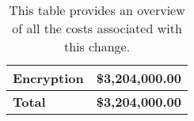\tiny \begin{longtable} {|l|r|} \caption{This table provides an overview of all the costs associated with this change.  \label{tab:totalcost}}\\ 
\hline 
\textbf{Encryption}&\textbf{\$3,204,000.00} \\ \hline
\textbf{Total}&\textbf{\$3,204,000.00} \\ \hline
\end{longtable} \normalsize
